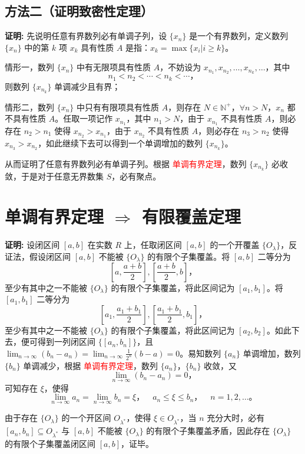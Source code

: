 \documentclass[lang=cn,newtx,10pt,scheme=chinese]{elegantbook}
\begin{document}
\subsection*{方法二（证明致密性定理）}
\textbf{证明:} 先说明任意有界数列必有单调子列，设 $\{x_n\}$ 是一个有界数列，定义数列 $\{x_n\}$ 中的第 $k$ 项 $x_k$ 具有性质 $A$ 是指：$x_k = \max \{x_i | i \geq k\}$。

情形一，数列 $\{x_n\}$ 中有无限项具有性质 $A$，不妨设为 $x_{n_1}, x_{n_2}, \ldots, x_{n_k}, \ldots$，其中
\[
n_1 < n_2 < \cdots < n_k < \cdots，
\]
则数列 $\{x_{n_k}\}$ 单调减少且有界；

情形二，数列 $\{x_n\}$ 中只有有限项具有性质 $A$，则存在 $N \in \mathbb{N}^+$，$\forall n > N$，$x_n$ 都不具有性质 $A$。任取一项记作 $x_{n_1}$，其中 $n_1 > N$，由于 $x_{n_1}$ 不具有性质 $A$，则必存在 $n_2 > n_1$ 使得 $x_{n_2} > x_{n_1}$，由于 $x_{n_2}$ 不具有性质 $A$，则必存在 $n_3 > n_2$ 使得 $x_{n_3} > x_{n_2}$，如此继续下去可以得到一个单调增加的数列 $\{x_{n_k}\}$。

从而证明了任意有界数列必有单调子列。根据 \textcolor{red}{单调有界定理}，数列 $\{x_{n_k}\}$ 必收敛，于是对于任意无界数集 $S$，必有聚点。

\section*{单调有界定理 $\Rightarrow$ 有限覆盖定理}

\textbf{证明:} 设闭区间 $[a, b]$ 在实数 $R$ 上，任取闭区间 $[a, b]$ 的一个开覆盖 $\{O_{\lambda}\}$，反证法，假设闭区间 $[a, b]$ 不能被 $\{O_{\lambda}\}$ 的有限个子集覆盖。将 $[a, b]$ 二等分为
\[
\left[ a, \frac{a + b}{2} \right], \left[ \frac{a + b}{2}, b \right]，
\]
至少有其中之一不能被 $\{O_{\lambda}\}$ 的有限个子集覆盖，将此区间记为 $[a_1, b_1]$。将 $[a_1, b_1]$ 二等分为
\[
\left[ a_1, \frac{a_1 + b_1}{2} \right], \left[ \frac{a_1 + b_1}{2}, b_1 \right]，
\]
至少有其中之一不能被 $\{O_{\lambda}\}$ 的有限个子集覆盖，将此区间记为 $[a_2, b_2]$。如此下去，便可得到一列闭区间 $\{[a_n, b_n]\}$，且 $\lim_{n \to \infty} (b_n - a_n) = \lim_{n \to \infty} \frac{1}{2^n} (b - a) = 0$。易知数列 $\{a_n\}$ 单调增加，数列 $\{b_n\}$ 单调减少，根据 \textcolor{red}{单调有界定理}，数列 $\{a_n\}$，$\{b_n\}$ 收敛，又
\[
\lim_{n \to \infty} (b_n - a_n) = 0，
\]
可知存在 $\xi$，使得
\[
\lim_{n \to \infty} a_n = \lim_{n \to \infty} b_n = \xi，\quad a_n \leq \xi \leq b_n，\quad n = 1, 2, \ldots。
\]

由于存在 $\{O_{\lambda}\}$ 的一个开区间 $O_{\lambda^*}$，使得 $\xi \in O_{\lambda^*}$，当 $n$ 充分大时，必有 $[a_n, b_n] \subseteq O_{\lambda^*}$ 与 $[a, b]$ 不能被 $\{O_{\lambda}\}$ 的有限个子集覆盖矛盾，因此存在 $\{O_{\lambda}\}$ 的有限个子集覆盖闭区间 $[a, b]$，证毕。
\end{document}
